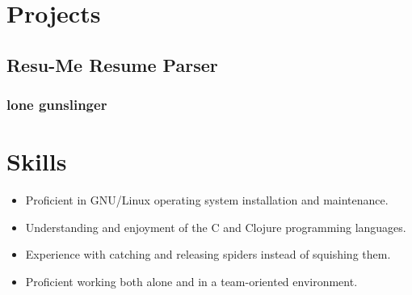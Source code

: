 \documentclass[11pt]{article}
\begin{document}
\section{Projects}
\subsection{Resu-Me Resume Parser}
\subsubsection{lone gunslinger
}
\section{Skills}
\begin{multicols}{2}
\begin{itemize}
\item Proficient in GNU/Linux operating system installation and maintenance.
\item Understanding and enjoyment of the C and Clojure programming languages.
\item Experience with catching and releasing spiders instead of squishing them.
\item Proficient working both alone and in a team-oriented environment.
\end{itemize}
\end{multicols}
\end{document}
